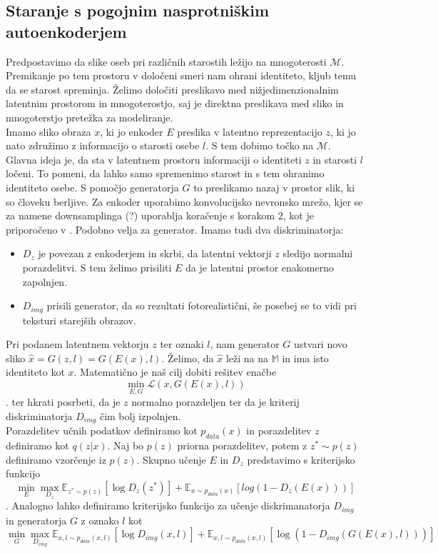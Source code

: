 \documentclass[12pt,a4paper,twoside]{article}
\theoremstyle{definition} %
\theoremstyle{plain} %
\numberwithin{equation}{section}  %
\begin{document}
\subsection{Staranje s pogojnim nasprotniškim autoenkoderjem}
Predpostavimo da slike oseb pri različnih starostih ležijo na mnogoterosti $\mathcal{M}$. Premikanje po tem prostoru v določeni smeri nam ohrani identiteto, kljub temu da se starost spreminja. Želimo določiti 
 preslikavo med nižjedimenzionalnim latentnim prostorom in mnogoterostjo, saj je direktna preslikava med sliko in mnogoterstjo pretežka za modeliranje. 
 \\ 
 Imamo sliko obraza $x$, ki jo enkoder $E$ preslika v latentno reprezentacijo $z$, ki jo nato združimo z informacijo o starosti osebe $l$. S tem dobimo točko na $\mathcal{M}$. Glavna ideja je, da sta v latentnem prostoru informaciji o identiteti $z$ in starosti $l$ ločeni. To pomeni, da lahko samo spremenimo starost in s tem ohranimo identiteto osebe. S pomočjo generatorja $G$ to preslikamo nazaj v prostor slik, ki so človeku berljive. 
Za enkoder uporabimo konvolucijsko nevronsko mrežo, kjer se za namene downsamplinga (?) uporablja koračenje s korakom 2, kot je priporočeno v \cite{radford2015unsupervised}. Podobno velja za generator. 
Imamo tudi dva diskriminatorja: 
\begin{itemize}
\item $D_z$ je povezan z enkoderjem in skrbi, da latentni vektorji $z$ sledijo normalni porazdelitvi. S tem želimo prisiliti $E$ da je latentni prostor enakomerno zapolnjen.
\item $D_{img}$ prisili generator, da so rezultati fotorealistični, še posebej  se to vidi pri teksturi starejših obrazov.  
\end{itemize}

Pri podanem latentnem vektorju $z$ ter oznaki $l$, nam generator $G$ ustvari novo sliko $\hat{x} = G(z,l) = G(E(x),l)$. Želimo, da $\hat{x}$ leži na na $\mathbb{M}$ in ima isto identiteto kot $x$. 
Matematično je naš  cilj  dobiti rešitev enačbe 
$$ \min_{E,G} \mathcal{L}(x,G(E(x),l))$$. 
 ter hkrati posrbeti, da je $z$ normalno porazdeljen ter da je kriterij diskriminatorja $D_{img}$ čim bolj izpolnjen.\\
 Porazdelitev učnih podatkov definiramo kot $p_{data}(x)$ in porazdelitev $z$ definiramo kot $q(z|x)$. Naj bo $p(z)$ priorna porazdelitev, potem z $z^* \sim p(z)$ definiramo vzorčenje iz $p(z)$. 
 Skupno učenje $E$ in $D_z$ predstavimo s kriterijsko funkcijo 
 $$ \min_E \max_{D_z}\mathbb{E}_{z^* \sim p(z)}[\log{D_z(z^*)}] + \mathbb{E}_{x \sim p_{data}(x)}[log(1-D_z(E(x)))]$$.
 Analogno lahko definiramo kriterijsko funkcijo za učenje diskrimanatorja $D_{img}$ in generatorja $G$ z oznako $l$ kot  
 $$ \min_G \max_{D_{img}} \mathbb{E}_{x,l \sim p_{data}(x,l)}[\log{D_{img}(x,l)}] + \mathbb{E}_{x,l \sim p_{data}(x,l)}[\log(1-D_{img}(G(E(x),l)))] $$
\end{document}

